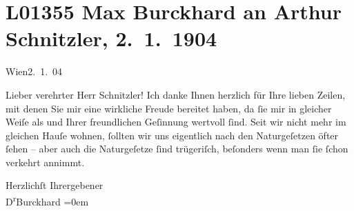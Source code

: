 

\section[Max Burckhard an Arthur Schnitzler, 2. 1. 1904]{L01355 Max Burckhard an Arthur Schnitzler, 2. 1. 1904}
\nopagebreak{}
\rehead{ }\normalsize\beginnumbering{}
\toendnotes[C]{\smallbreak\pagebreak[2]}
\toendnotes[C]{\smallbreak}
\pstart
           \raggedleft{}{\pb}Wien2. 1. 04\pend
           
\pstart{}Lieber verehrter Herr Schnitzler!\pend\vspace{0.5em}
\pstart
           Ich danke Ihnen herzlich für Ihre lieben Zeilen, mit denen Sie mir eine wirkliche
               Freude bereitet haben, da ſie mir in gleicher Weiſe als \label{K_L01355-1v}\label{K_L01355-1} und Ihrer freundlichen Geſinnung wertvoll ſind.
               Seit wir nicht mehr im gleichen Hauſe wohnen, ſollten wir uns eigentlich nach den
               Naturgeſetzen öfter ſehen – aber {\pb}auch die
               Naturgeſetze ſind trügeriſch, beſonders wenn man ſie ſchon verkehrt annimmt.\pend
           
\pstart
           Herzlichſt Ihr\hspace*{1.5em}ergebener{\\[\baselineskip]}\spacefill\mbox{D\textsuperscript{r}Burckhard}\pend
           \leftskip=0em{}\endnumbering{}  
      